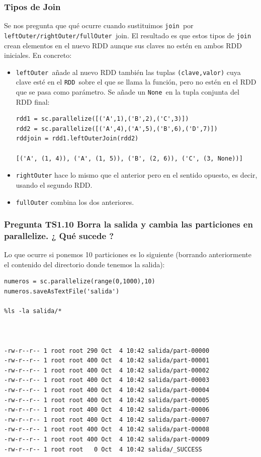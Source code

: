 \documentclass[11pt]{article}
\def\inline{\lstinline[basicstyle=\ttfamily,keywordstyle={}]}
\begin{document}
{{\subsubsection*{ Tipos de Join }

Se nos pregunta que qué ocurre cuando sustituimos \inline{join }por \inline{leftOuter/rightOuter/fullOuter }join. El resultado es que estos tipos de \inline{join }crean elementos en el nuevo RDD aunque sus claves no estén en ambos RDD iniciales. En concreto:
\begin{itemize}
\item  \inline{leftOuter }añade al nuevo RDD también las tuplas  \inline{(clave,valor)} cuya clave esté en el \inline{RDD }sobre el que se llama la función, pero no estén en el RDD que se pasa como parámetro. Se añade un \inline{None }en la tupla conjunta del RDD final:
\begin{verbatim}
rdd1 = sc.parallelize([('A',1),('B',2),('C',3)])
rdd2 = sc.parallelize([('A',4),('A',5),('B',6),('D',7)])
rddjoin = rdd1.leftOuterJoin(rdd2)

[('A', (1, 4)), ('A', (1, 5)), ('B', (2, 6)), ('C', (3, None))]
\end{verbatim}

\item  \inline{rightOuter} hace lo mismo que el anterior pero en el sentido opuesto, es decir, usando el segundo RDD.
\item  \inline{fullOuter} combina los dos anteriores.

\end{itemize}

\subsubsection*{ Pregunta TS1.10 Borra la salida y cambia las particiones en parallelize. ¿ Qué sucede ?}

Lo que ocurre si ponemos 10 particiones es lo siguiente (borrando anteriormente el contenido del directorio donde tenemos la salida):
\begin{verbatim}
numeros = sc.parallelize(range(0,1000),10)
numeros.saveAsTextFile('salida')

%ls -la salida/*



-rw-r--r-- 1 root root 290 Oct  4 10:42 salida/part-00000
-rw-r--r-- 1 root root 400 Oct  4 10:42 salida/part-00001
-rw-r--r-- 1 root root 400 Oct  4 10:42 salida/part-00002
-rw-r--r-- 1 root root 400 Oct  4 10:42 salida/part-00003
-rw-r--r-- 1 root root 400 Oct  4 10:42 salida/part-00004
-rw-r--r-- 1 root root 400 Oct  4 10:42 salida/part-00005
-rw-r--r-- 1 root root 400 Oct  4 10:42 salida/part-00006
-rw-r--r-- 1 root root 400 Oct  4 10:42 salida/part-00007
-rw-r--r-- 1 root root 400 Oct  4 10:42 salida/part-00008
-rw-r--r-- 1 root root 400 Oct  4 10:42 salida/part-00009
-rw-r--r-- 1 root root   0 Oct  4 10:42 salida/_SUCCESS
\end{verbatim}

}}
\end{document}
